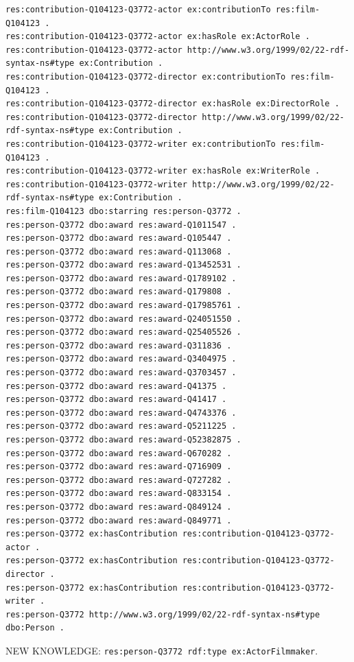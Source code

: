 \documentclass[
  11pt,
]{article}
\begin{document}
\begin{verbatim}
res:contribution-Q104123-Q3772-actor ex:contributionTo res:film-Q104123 .
res:contribution-Q104123-Q3772-actor ex:hasRole ex:ActorRole .
res:contribution-Q104123-Q3772-actor http://www.w3.org/1999/02/22-rdf-syntax-ns#type ex:Contribution .
res:contribution-Q104123-Q3772-director ex:contributionTo res:film-Q104123 .
res:contribution-Q104123-Q3772-director ex:hasRole ex:DirectorRole .
res:contribution-Q104123-Q3772-director http://www.w3.org/1999/02/22-rdf-syntax-ns#type ex:Contribution .
res:contribution-Q104123-Q3772-writer ex:contributionTo res:film-Q104123 .
res:contribution-Q104123-Q3772-writer ex:hasRole ex:WriterRole .
res:contribution-Q104123-Q3772-writer http://www.w3.org/1999/02/22-rdf-syntax-ns#type ex:Contribution .
res:film-Q104123 dbo:starring res:person-Q3772 .
res:person-Q3772 dbo:award res:award-Q1011547 .
res:person-Q3772 dbo:award res:award-Q105447 .
res:person-Q3772 dbo:award res:award-Q113068 .
res:person-Q3772 dbo:award res:award-Q13452531 .
res:person-Q3772 dbo:award res:award-Q1789102 .
res:person-Q3772 dbo:award res:award-Q179808 .
res:person-Q3772 dbo:award res:award-Q17985761 .
res:person-Q3772 dbo:award res:award-Q24051550 .
res:person-Q3772 dbo:award res:award-Q25405526 .
res:person-Q3772 dbo:award res:award-Q311836 .
res:person-Q3772 dbo:award res:award-Q3404975 .
res:person-Q3772 dbo:award res:award-Q3703457 .
res:person-Q3772 dbo:award res:award-Q41375 .
res:person-Q3772 dbo:award res:award-Q41417 .
res:person-Q3772 dbo:award res:award-Q4743376 .
res:person-Q3772 dbo:award res:award-Q5211225 .
res:person-Q3772 dbo:award res:award-Q52382875 .
res:person-Q3772 dbo:award res:award-Q670282 .
res:person-Q3772 dbo:award res:award-Q716909 .
res:person-Q3772 dbo:award res:award-Q727282 .
res:person-Q3772 dbo:award res:award-Q833154 .
res:person-Q3772 dbo:award res:award-Q849124 .
res:person-Q3772 dbo:award res:award-Q849771 .
res:person-Q3772 ex:hasContribution res:contribution-Q104123-Q3772-actor .
res:person-Q3772 ex:hasContribution res:contribution-Q104123-Q3772-director .
res:person-Q3772 ex:hasContribution res:contribution-Q104123-Q3772-writer .
res:person-Q3772 http://www.w3.org/1999/02/22-rdf-syntax-ns#type dbo:Person .
\end{verbatim}

NEW KNOWLEDGE:
\texttt{res:\allowbreak{}pers\allowbreak{}on-\allowbreak{}\allowbreak{}Q3772\allowbreak{} rdf:\allowbreak{}typ\allowbreak{}e ex:\allowbreak{}\allowbreak{}Act\allowbreak{}or\allowbreak{}Filmma\allowbreak{}ker}.
\end{document}
